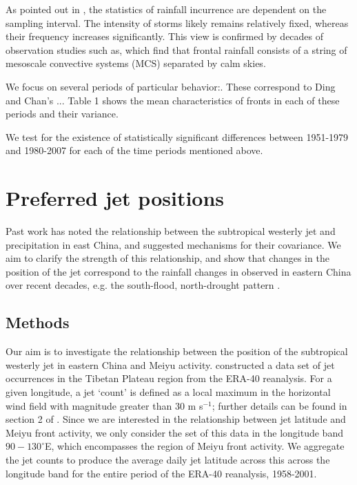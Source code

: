 \documentclass[draft,grl]{AGUTeX}
\begin{document}
\begin{article}
	As pointed out in \citet{Biasutti2011}, the statistics of rainfall incurrence are dependent on the sampling interval. The intensity of storms likely remains relatively fixed, whereas their frequency increases significantly. This view is confirmed by decades of observation studies such as\citet{Murakami1984}, which find that frontal rainfall consists of a string of mesoscale convective systems (MCS) separated by calm skies.
	
	We focus on several periods of particular behavior:. These correspond to Ding and Chan's ... Table 1 shows the mean characteristics of fronts in each of these periods and their variance.
	
	
	We test for the existence of statistically significant differences between 1951-1979 and 1980-2007 for each of the time periods mentioned above.
	
\section{Preferred jet positions}
Past work has noted the relationship between the subtropical westerly jet and precipitation in east China, and suggested mechanisms for their covariance\citep{Molnar2010, Sampe2010, Chen2014}. We aim to clarify the strength of this relationship, and show that changes in the position of the jet correspond to the rainfall changes in observed in eastern China over recent decades, e.g. the south-flood, north-drought pattern \citep{Nigam2013}. 

\subsection{Methods} 

Our aim is to investigate the relationship between the position of the subtropical westerly jet in eastern China and Meiyu activity. \citep{Schiemann2009} constructed a data set of jet occurrences in the Tibetan Plateau region from the ERA-40 reanalysis.  For a given longitude, a jet `count'  is defined as a local maximum in the horizontal wind field with magnitude greater than $30$ m s$^{-1}$; further details can be found in section 2 of \citep{Schiemann2009}. Since we are interested in the relationship between jet latitude and Meiyu front activity, we only consider the set of this data in the longitude band $90-130^\circ$E, which encompasses the region of Meiyu front activity. We aggregate the jet counts to produce the average daily jet latitude across this across the longitude band for the entire period of the ERA-40 reanalysis, 1958-2001. 


\end{article}
\end{document}

